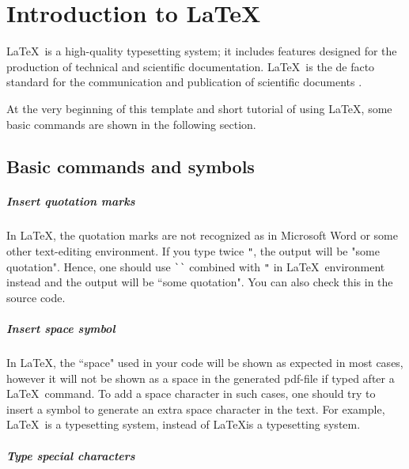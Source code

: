 \chapter{Introduction to \LaTeX}

\graphicspath{ {graphics/Chapter1/} }

\LaTeX~is a high-quality typesetting system; it includes features designed for the production of technical and scientific documentation. \LaTeX~is the de facto standard for the communication and publication of scientific documents \cite{LaTeX3Team.}.

At the very beginning of this template and short tutorial of using \LaTeX, some basic commands are shown in the following section.

\section{Basic commands and symbols}

	\paragraph{Insert quotation marks}
	
	In \LaTeX, the quotation marks are not recognized as in Microsoft Word or some other text-editing environment. If you type twice {\verb|"|}, the output will be \colorbox{yellow!50}{"some quotation"}. Hence, one should use {\verb|``|} combined with {\verb|"|} in \LaTeX~environment instead and the output will be \colorbox{yellow!50}{``some quotation"}. You can also check this in the source code.
	
	\paragraph{Insert space symbol}
	
	In \LaTeX, the ``space" used in your code will be shown as expected in most cases, however it will not be shown as a space in the generated pdf-file if typed after a \LaTeX~command. To add a space character in such cases, one should try to insert a {\color{blue}{\verb|~|}} symbol to generate an extra space character in the text. For example, \colorbox{yellow!50}{\LaTeX~is a typesetting system}, instead of \colorbox{yellow!50}{\LaTeX is a typesetting system}.
	
	\paragraph{Type special characters}
	
